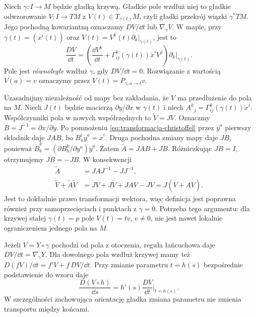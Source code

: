 \begin{definicja}
\label{def:pochodna-wzdluz-krzywej}
Niech $\gamma:I\to M$ będzie gładką krzywą.
Gładkie pole wzdłuż niej to gładkie odwzorowanie
$V:I\to TM$ z $V(t)\in T_{\gamma(t)}M$,
czyli gładki przekrój wiązki $\gamma^*TM$.
Jego pochodną kowariantną oznaczamy
$D V/\dd t$ lub $\nabla_{\dot\gamma}V$.
W mapie, przy $\gamma(t)=(x^i(t))$ oraz
$V(t)=V^k(t)\partial_k|_{\gamma(t)}$, jest to
\begin{equation}\label{eq:pochodna-kowariantna-krzywa}
 \frac{D V}{\dd t}
 =\left(\frac{\dd V^k}{\dd t}
   +\Gamma^k_{ij}(\gamma(t))\dot x^i V^j\right)
    \partial_k\big|_{\gamma(t)}.
\end{equation}
Pole jest \emph{równoległe} wzdłuż $\gamma$,
gdy $DV/\dd t=0$. Rozwiązanie z wartością
$V(a)=v$ oznaczymy przez $V(t)=P_{\gamma,a\to t}v$.
\end{definicja}

Uzasadnijmy niezależność od mapy bez zakładania, że $V$
ma przedłużenie do pola na $M$. Niech $J(t)$ będzie macierzą
$\partial y/\partial x$ w $\gamma(t)$ i niech
$A^k{}_j=\Gamma^k_{ij}(\gamma(t))\dot x^i$.
Współczynniki pola w nowych współrzędnych to
$\widetilde V=JV$. Oznaczmy $B=J^{-1}=\partial x/\partial y$.
Po pomnożeniu \eqref{eq:transformacja-christoffel} przez
$\dot y^a$ pierwszy składnik daje $JAB$, bo
$B^i_a\dot y^a=\dot x^i$. Druga pochodna zmiany mapy
daje $J\dot B$, ponieważ
$\dot B^k_b=(\partial B^k_b/\partial y^a)\dot y^a$.
Zatem $\widetilde A=JAB+J\dot B$.
Różniczkując $JB=I$, otrzymujemy
$J\dot B=-\dot J B$. W konsekwencji
\begin{align*}
 \widetilde A&=JAJ^{-1}-\dot J J^{-1},\\
 \dot{\widetilde V}+\widetilde A\widetilde V
 &=\dot J V+J\dot V+JAV-\dot J V
 =J(\dot V+AV).
\end{align*}
Jest to dokładnie prawo transformacji wektora, więc definicja
jest poprawna również przy samoprzecięciach i punktach
z $\dot\gamma=0$. Potrzeba tego argumentu: dla krzywej
stałej $\gamma(t)=p$ pole $V(t)=t v$, $v\ne0$, nie jest
nawet lokalnie ograniczeniem jednego pola na $M$.

Jeżeli $V=Y\circ\gamma$ pochodzi od pola z otoczenia,
reguła łańcuchowa daje $DV/\dd t=\nabla_{\dot\gamma}Y$.
Dla dowolnego pola wzdłuż krzywej mamy też
$D(fV)/\dd t=f'V+f\,DV/\dd t$. Przy zmianie parametru
$t=h(s)$ bezpośrednie podstawienie do wzoru daje
\begin{equation}\label{eq:transport-reparametryzacja}
 \frac{D(V\circ h)}{\dd s}
   =h'(s)\frac{DV}{\dd t}\bigg|_{t=h(s)}.
\end{equation}
W szczególności zachowująca orientację gładka zmiana
parametru nie zmienia transportu między końcami.

